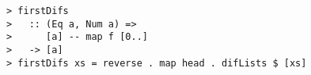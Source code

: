 \documentclass[10pt]{article}
\begin{document}
\begin{verbatim}
> firstDifs 
>   :: (Eq a, Num a) => 
>      [a] -- map f [0..]
>   -> [a]
> firstDifs xs = reverse . map head . difLists $ [xs]
\end{verbatim}
\end{document}
